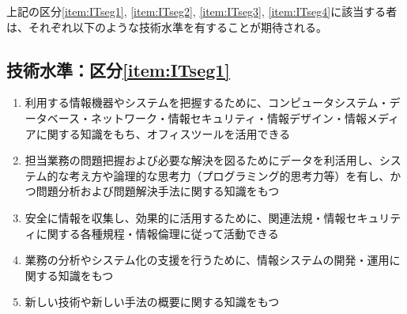 \clearpage
上記の区分\ref{item:ITseg1}, \ref{item:ITseg2}, \ref{item:ITseg3}, \ref{item:ITseg4}\hx に該当する者は、それぞれ以下のような技術水準を有することが期待される。

\subsection{技術水準：区分\ref{item:ITseg1}}
\begin{enumerate}
\item 利用する情報機器やシステムを把握するために、コンピュータシステム・データベース・ネットワーク・情報セキュリティ・情報デザイン・情報メディアに関する知識をもち、オフィスツールを活用できる
\item 担当業務の問題把握および必要な解決を図るためにデータを利活用し、システム的な考え方や論理的な思考力（プログラミング的思考力等）を有し、かつ問題分析および問題解決手法に関する知識をもつ
\item 安全に情報を収集し、効果的に活用するために、関連法規・情報セキュリティに関する各種規程・情報倫理に従って活動できる
\item 業務の分析やシステム化の支援を行うために、情報システムの開発・運用に関する知識をもつ
\item 新しい技術や新しい手法の概要に関する知識をもつ
\end{enumerate}

